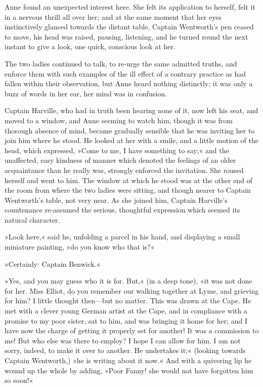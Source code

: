 Anne found an unexpected interest here. She felt its application to herself, felt it in a nervous thrill all over her; and at the same moment that her eyes instinctively glanced towards the distant table, Captain Wentworth's pen ceased to move, his head was raised, pausing, listening, and he turned round the next instant to give a look, one quick, conscious look at her.

The two ladies continued to talk, to re-urge the same admitted truths, and enforce them with such examples of the ill effect of a contrary practice as had fallen within their observation, but Anne heard nothing distinctly; it was only a buzz of words in her ear, her mind was in confusion.

Captain Harville, who had in truth been hearing none of it, now left his seat, and moved to a window, and Anne seeming to watch him, though it was from thorough absence of mind, became gradually sensible that he was inviting her to join him where he stood. He looked at her with a smile, and a little motion of the head, which expressed, »Come to me, I have something to say;« and the unaffected, easy kindness of manner which denoted the feelings of an older acquaintance than he really was, strongly enforced the invitation. She roused herself and went to him. The window at which he stood was at the other end of the room from where the two ladies were sitting, and though nearer to Captain Wentworth's table, not very near. As she joined him, Captain Harville's countenance re-assumed the serious, thoughtful expression which seemed its natural character.

»Look here,« said he, unfolding a parcel in his hand, and displaying a small miniature painting, »do you know who that is?«

»Certainly: Captain Benwick.«

»Yes, and you may guess who it is for. But,« (in a deep tone), »it was not done for her. Miss Elliot, do you remember our walking together at Lyme, and grieving for him? I little thought then—but no matter. This was drawn at the Cape. He met with a clever young German artist at the Cape, and in compliance with a promise to my poor sister, sat to him, and was bringing it home for her; and I have now the charge of getting it properly set for another! It was a commission to me! But who else was there to employ? I hope I can allow for him. I am not sorry, indeed, to make it over to another. He undertakes it;« (looking towards Captain Wentworth,) »he is writing about it now.« And with a quivering lip he wound up the whole by adding, »Poor Fanny! she would not have forgotten him so soon!«

